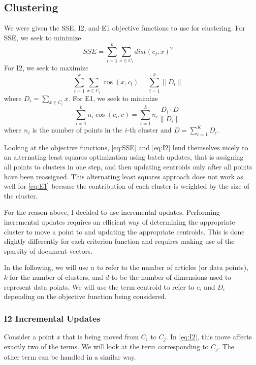 \documentclass[11pt]{article}
\begin{document}
        \subsection{Clustering}
        We were given the SSE, I2, and E1 objective functions to use for clustering. For SSE, we seek to minimize
        \begin{equation}
          SSE = \sum_{i=1}^k \sum_{x \in C_i} dist(c_i, x)^2
          \label{eq:SSE}
        \end{equation}
        For I2, we seek to maximize
        \begin{equation}
          \sum_{i=1}^k \sum_{x \in C_i} \cos (x, c_i) = \sum_{i=1}^k \|D_i\|
          \label{eq:I2}
        \end{equation}
        where $D_i = \sum_{x \in C_i} x$. For E1, we seek to minimize
        \begin{equation}
          \sum_{i=1}^k n_i \cos (c_i, c) = \sum_{i=1}^k n_i \frac{D_i \cdot D}{\| D_i \|}
          \label{eq:E1}
        \end{equation}
        where $n_i$ is the number of points in the $i$-th cluster and $D = \sum_{i=1}^K D_i$.

        Looking at the objective functions, \eqref{eq:SSE} and \eqref{eq:I2} lend themselves nicely to an alternating least squares optimization using batch updates, that is assigning all
        points to clusters in one step, and then updating centroids only after all points have been reassigned. This alternating least squares
        approach does not work as well for \eqref{eq:E1} because the contribution of each cluster is weighted by the size of the cluster.

        For the reason above, I decided to use incremental updates. Performing incremental updates requires an efficient way of determining the
        appropriate cluster to move a point to and updating the appropriate centroids. This is done slightly differently for each criterion function
        and requires making use of the sparsity of document vectors.

        In the following, we will use $n$ to refer to the number of articles (or data points), $k$ for the number of clusters, and $d$ to be the number of dimensions used to represent
        data points. We will use the term centroid to refer to $c_i$ and $D_i$ depending on the objective function being considered.

        \subsubsection{I2 Incremental Updates}
        Consider a point $x$ that is being moved from $C_i$ to $C_j$. In \eqref{eq:I2}, this move affects exactly two of the terms. We will look at
        the term corresponding to $C_j$. The other term can be handled in a similar way.
\end{document}
